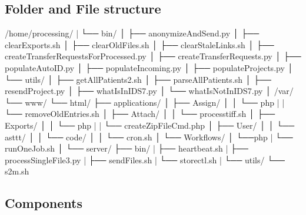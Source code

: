 \documentclass[letterpaper,10pt,english]{sphinxmanual}
\begin{document}
\subsection{Folder and File structure}
\label{\detokenize{Architecture/index:folder-and-file-structure}}
\begin{sphinxVerbatim}[commandchars=\\\{\}]
/home/processing/
|          └── bin/
│               ├── anonymizeAndSend.py
│               ├── clearExports.sh
│               ├── clearOldFiles.sh
│               ├── clearStaleLinks.sh
│               ├── createTransferRequestsForProcessed.py
│               ├── createTransferRequests.py
│               ├── populateAutoID.py
│               ├── populateIncoming.py
│               ├── populateProjects.py
│               └── utils/
│                      ├── getAllPatients2.sh
│                      ├── parseAllPatients.sh
│                      ├── resendProject.py
│                      ├── whatIsInIDS7.py
│                      └── whatIsNotInIDS7.py
│
/var/
  └── www/
       └── html/
             ├── applications/
             │          ├── Assign/
             │          │     └── php
             |          |          └── removeOldEntries.sh
             │          ├── Attach/
             │          │     └── process\PYGZus{}tiff.sh
             │          ├── Exports/
             │          │     └── php
             |          |          └── createZipFileCmd.php
             │          ├── User/
             │          │     └── asttt/
             │          │            └── code/
             │          │                  └── cron.sh
             │          └── Workflows/
             │                 └──php
             |                    └── runOneJob.sh
             │
             └── server/
                    ├── bin/
                    |    ├── heartbeat.sh
                    |    ├── processSingleFile3.py
                    |    ├── sendFiles.sh
                    |    └── storectl.sh
                    |
                    └── utils/
                          └── s2m.sh
\end{sphinxVerbatim}


\subsection{Components}
\label{\detokenize{Architecture/index:components}}
\sphinxstepscope
\end{document}
